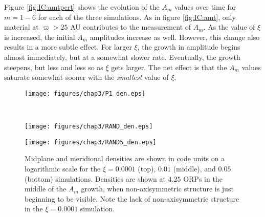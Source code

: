 Figure \ref{fig:IC:amtpert} shows the evolution of the $A_m$ values over time for $m = 1 -6$ for each of the three simulations. As in figure \ref{fig:IC:amt}, only material at $\varpi > 25$ AU contributes to the measurement of $A_m$. As the value of $\xi$ is increased, the initial $A_m$ amplitudes increase as well. However, this change also results in a more subtle effect. For larger $\xi$, the growth in amplitude begins almost immediately, but at a somewhat slower rate. Eventually, the growth steepens, but less and less so as $\xi$ gets larger. The net effect is that the $A_m$ values saturate somewhat sooner with the {\it smallest} value of $\xi$. 

\begin{figure}[p]
\centering
{}
\begin{minipage}[t]{6.3in}
\centering
\texttt{[image: figures/chap3/P1\_den.eps]}
\end{minipage}\\
\begin{minipage}[t]{6.3in}
\centering
\texttt{[image: figures/chap3/RAND\_den.eps]}
\end{minipage}
\begin{minipage}[t]{6.3in}
\centering
\texttt{[image: figures/chap3/RAND5\_den.eps]}
\end{minipage}
\caption[Midplane and meridional densities for varying initial random perturbation amplitudes]{Midplane and meridional densities are shown in code units on a logarithmic scale for the $\xi = 0.0001$ (top), $0.01$ (middle), and $0.05$ (bottom) simulations. Densities are shown at $4.25$ ORPs in the middle of the $A_m$ growth, when non-axisymmetric structure is just beginning to be visible. Note the lack of non-axisymmetric structure in the $\xi = 0.0001$ simulation.}
\label{fig:IC:denpert}
\end{figure}

